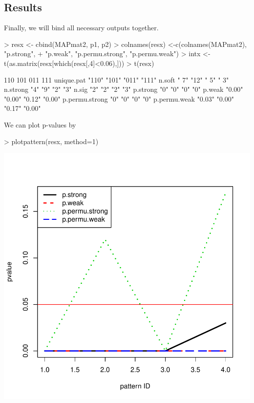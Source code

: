 \documentclass[a4paper]{report}
\begin{document}
\subsection*{Results}
Finally, we will bind all necessary outputs together. 
\begin{Schunk}
\begin{Sinput}
> resx <- cbind(MAPmat2, p1, p2)
> colnames(resx) <-c(colnames(MAPmat2), "p.strong", 
+ "p.weak", "p.permu.strong", "p.permu.weak")
> intx <- t(as.matrix(resx[which(resx[,4]<0.06),]))
> t(resx)
\end{Sinput}
\begin{Soutput}
               110    101    011    111   
unique.pat     "110"  "101"  "011"  "111" 
n.soft         " 7"   "12"   " 5"   " 3"  
n.strong       "4"    "9"    "2"    "3"   
n.sig          "2"    "2"    "2"    "3"   
p.strong       "0"    "0"    "0"    "0"   
p.weak         "0.00" "0.00" "0.12" "0.00"
p.permu.strong "0"    "0"    "0"    "0"   
p.permu.weak   "0.03" "0.00" "0.17" "0.00"
\end{Soutput}
\end{Schunk}
We can plot p-values by
\begin{center}
\begin{Schunk}
\begin{Sinput}
> plotpattern(resx, method=1)
\end{Sinput}
\end{Schunk}
\includegraphics{MAMA_full-055}
\end{center}
\end{document}
